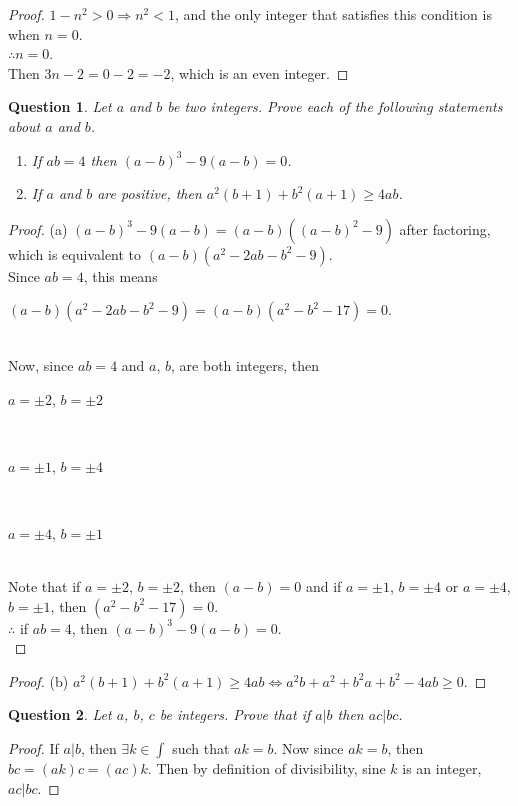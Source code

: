 \documentclass[11pt,oneside]{article}
\newtheorem{question}{Question}
\begin{document}
\begin{proof}
    $1 - n^2 > 0 \Rightarrow n^2 < 1$, and the only integer that satisfies this condition is when $n = 0$.\\
    $\therefore n = 0$.\\
    Then $3n - 2 = 0 - 2 = -2$, which is an even integer.
\end{proof}

\bigskip

\begin{question}
    Let $a$ and $b$ be two integers. Prove each of the following statements about $a$ and $b$. \\
    \begin{enumerate}
    	\item[(a)] If $ab = 4$ then $(a-b)^3 - 9(a-b) = 0$.
    	\item[(b)] If $a$ and $b$ are positive, then $a^2(b+1) + b^2(a+1) \geq 4ab$.  
    \end{enumerate}
\end{question}

\begin{proof}
	 (a) $(a-b)^3 - 9(a-b) = (a-b)((a-b)^2-9)$ after factoring, which is equivalent to $(a-b)(a^2 - 2ab - b^2 - 9)$.\\
	 Since $ab = 4$, this means \\
	 \centerline{$(a-b)(a^2 - 2ab - b^2 - 9) = (a-b)(a^2 - b^2 - 17) = 0$.} \\
	 Now, since $ab=4$ and $a$, $b$, are both integers, then\\
	 \centerline{$a=\pm2$, $b=\pm2$}\\
	 \centerline{$a=\pm1$, $b=\pm4$}\\
	 \centerline{$a=\pm4$, $b=\pm1$}\\
	 Note that if $a=\pm2$, $b=\pm2$, then $(a-b)=0$ and if $a=\pm1$, $b=\pm4$ or $a=\pm4$, $b=\pm1$, then $(a^2 - b^2 - 17) = 0$.\\
	 $\therefore$ if $ab = 4$, then $(a-b)^3 - 9(a-b) = 0$.
	 \\
\end{proof}
\begin{proof}
	(b) $a^2(b+1)+b^2(a+1) \geq 4ab \iff a^2b + a^2 + b^2a + b^2 - 4ab \geq 0$.
\end{proof}

\begin{question}
	Let $a$, $b$, $c$ be integers. Prove that if $a | b$ then $ac | bc$.
\end{question}
\begin{proof}
	If $a | b$, then $\exists k \in \int$ such that $ak = b$.
	Now since $ak = b$, then $bc = (ak)c = (ac)k$. Then by definition of divisibility, sine $k$ is an integer, $ac|bc$.
\end{proof}
\end{document}

